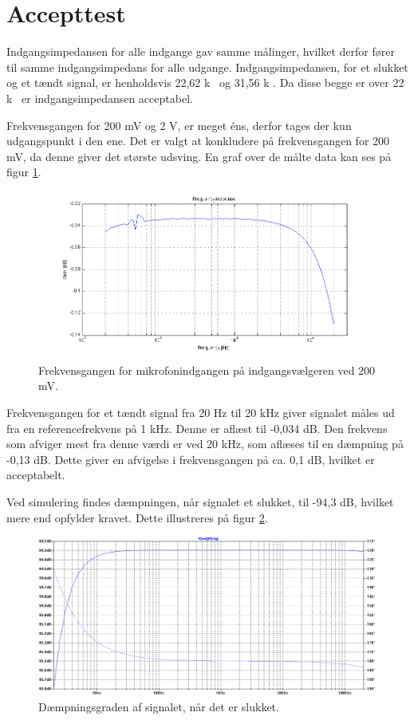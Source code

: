 \section{Accepttest}
Indgangsimpedansen for alle indgange gav samme målinger, hvilket derfor fører til samme indgangsimpedans for alle udgange. Indgangsimpedansen, for et slukket og et tændt signal, er henholdsvis 22,62 k\ohm~ og 31,56 k \ohm . Da disse begge er over 22 k\ohm~ er indgangsimpedansen acceptabel.

Frekvensgangen for 200 mV og 2 V, er meget éns, derfor tages der kun udgangspunkt i den ene. Det er valgt at konkludere på frekvensgangen for 200 mV, da denne giver det største udsving. En graf over de målte data kan ses på figur \ref{fig:indacc:frek200mv}.
\begin{figure}[h]
\centering
\includegraphics[width=\textwidth]{maalerapporter/indgangsvaelger/Indgangsvlger-mic-200mv-frek.png}
\caption{Frekvensgangen for mikrofonindgangen på indgangsvælgeren ved 200 mV.}
\label{fig:indacc:frek200mv}
\end{figure}

Frekvensgangen for et tændt signal fra 20 Hz til 20 kHz giver signalet måles ud fra en referencefrekvens på 1 kHz. Denne er aflæst til -0,034 dB. Den frekvens som afviger mest fra denne værdi er ved 20 kHz, som aflæses til en dæmpning på -0,13 dB. Dette giver en afvigelse i frekvensgangen på ca. 0,1 dB, hvilket er acceptabelt.

Ved simulering findes dæmpningen, når signalet et slukket, til -94,3 dB, hvilket mere end opfylder kravet. Dette illustreres på figur \ref{fig:indaccept:slukketsimulering}.
\begin{figure}[h]
\centering
\includegraphics[width=\textwidth]{teknisk/indgangsvaelger/simulering/daempning_af_signal.png}
\caption{Dæmpningsgraden af signalet, når det er slukket.}
\label{fig:indaccept:slukketsimulering}
\end{figure}

